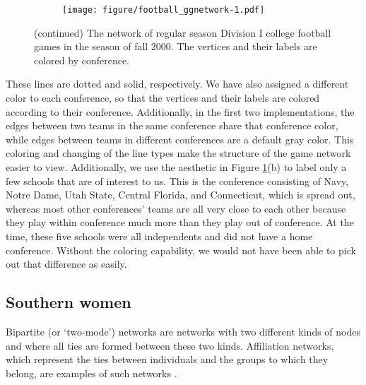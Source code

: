 \begin{figure}
\begin{subfigure}[t]{\textwidth}
\begin{adjustbox}{valign=t}
\begin{minipage}{.49\textwidth}
                   \end{minipage}

                  \begin{minipage}{.49\textwidth}

\texttt{[image: figure/football\_ggnetwork-1.pdf]}

                          \end{minipage}

                          \end{adjustbox}
\end{subfigure}
\caption{\label{fig.cap:football}(continued) The network of regular season Division I college football games in the season of fall 2000. The vertices and their labels are colored by conference.}
\end{figure}

\noindent
These lines are dotted and solid, respectively. We have also assigned a different color to each conference, so that the vertices and their labels are colored according to their conference. Additionally, in the first two implementations, the edges between two teams in the same conference share that conference color, while edges between teams in different conferences are a default gray color. This coloring and changing of the line types make the structure of the game network easier to view. Additionally, we use the  aesthetic in Figure \ref{fig.cap:football}(b) to label only a few schools that are of interest to us. This is the conference consisting of Navy, Notre Dame, Utah State, Central Florida, and Connecticut, which is spread out, whereas most other conferences' teams are all very close to each other because they play within conference much more than they play out of conference.  At the time, these five schools were all independents and did not have a home conference.  Without the coloring capability, we would not have been able to pick out that difference as easily.

\subsection{Southern women} 

Bipartite (or `two-mode') networks are networks with two different kinds of nodes and where all ties are formed between these two kinds. Affiliation networks, which represent the ties between individuals and the groups to which they belong, are examples of such networks \citep[see][p.~53-54 and p.~123-127]{newman}.

